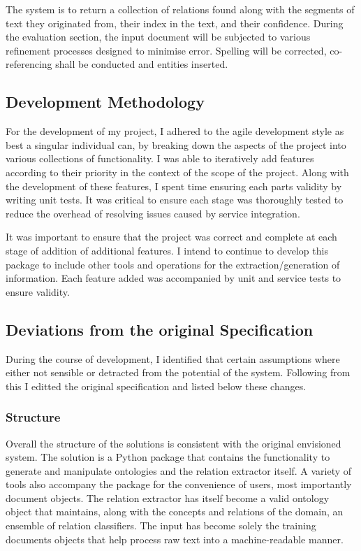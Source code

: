\documentclass[12pt]{article} %
\begin{document}
The system is to return a collection of relations found along with the  segments of text they originated from, their index in the text, and their confidence. During the evaluation section, the input document will be subjected to various refinement processes designed to minimise error. Spelling will be corrected, co-referencing shall be conducted and entities inserted.

\subsection{Development Methodology}

For the development of my project, I adhered to the agile development style as best a singular individual can, by breaking down the aspects of the project into various collections of functionality. I was able to iteratively add features according to their priority in the context of the scope of the project. Along with the development of these features, I spent time ensuring each parts validity by writing unit tests. It was critical to ensure each stage was thoroughly tested to reduce the overhead of resolving issues caused by service integration.

It was important to ensure that the project was correct and complete at each stage of addition of additional features. I intend to continue to develop this package to include other tools and operations for the extraction/generation of information. Each feature added was accompanied by unit and service tests to ensure validity.

\subsection{Deviations from the original Specification}

During the course of development, I identified that certain assumptions where either not sensible or detracted from the potential of the system. Following from this I editted the original specification and listed below these changes.

\subsubsection{Structure}

Overall the structure of the solutions is consistent with the original envisioned system. The solution is a Python package that contains the functionality to generate and manipulate ontologies and the relation extractor itself. A variety of tools also accompany the package for the convenience of users, most importantly document objects. The relation extractor has itself become a valid ontology object that maintains, along with the concepts and relations of the domain, an ensemble of relation classifiers. The input has become solely the training documents objects that help process raw text into a machine-readable manner.
\end{document}
